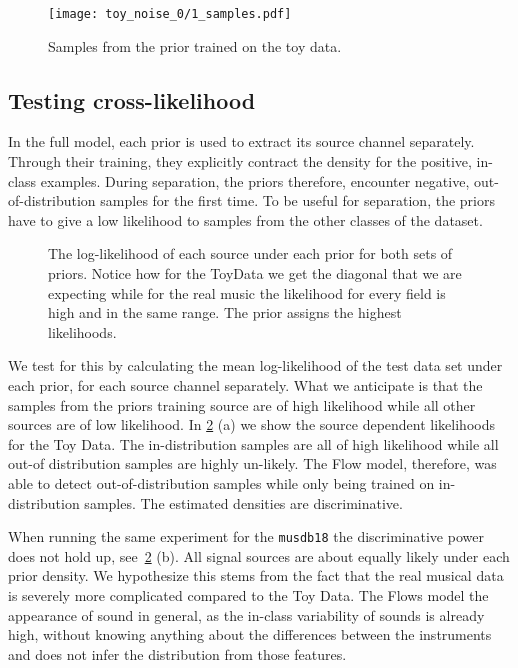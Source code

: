 \begin{figure}
    \texttt{[image: toy\_noise\_0/1\_samples.pdf]}%
    \label{fig:toy_time_sample}%
    \caption{Samples from the prior trained on the toy data.}
\end{figure}

\subsection{Testing cross-likelihood}
In the full model, each prior is used to extract its source channel separately. Through their training, they explicitly contract the density for the positive, in-class examples. During separation, the priors therefore, encounter negative, out-of-distribution samples for the first time. To be useful for separation, the priors have to give a low likelihood to samples from the other classes of the dataset.

\begin{figure}
    \centering
    \caption{The log-likelihood of each source under each prior for both sets of priors. Notice how for the ToyData we get the diagonal that we are expecting while for the real music the likelihood for every field is high and in the same range. The  prior assigns the highest likelihoods.}%
    \label{fig:noiseless_channels}%
\end{figure}

We test for this by calculating the mean log-likelihood of the test data set under each prior, for each source channel separately. What we anticipate is that the samples from the priors training source are of high likelihood while all other sources are of low likelihood. In \cref{fig:noiseless_channels} (a) we show the source dependent likelihoods for the Toy Data. The in-distribution samples are all of high likelihood while all out-of distribution samples are highly un-likely. The Flow model, therefore, was able to detect out-of-distribution samples while only being trained on in-distribution samples. The estimated densities are discriminative.

When running the same experiment for the \texttt{musdb18} the discriminative power does not hold up, see~\cref{fig:noiseless_channels} (b). All signal sources are about equally likely under each prior density. We hypothesize this stems from the fact that the real musical data is severely more complicated compared to the Toy Data. The Flows model the appearance of sound in general, as the in-class variability of sounds is already high, without knowing anything about the  differences between the instruments and does not infer the distribution from those features.

